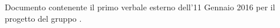Documento contenente il primo verbale esterno dell'11 Gennaio 2016 per il progetto \progetto{} del gruppo \gruppo{}.